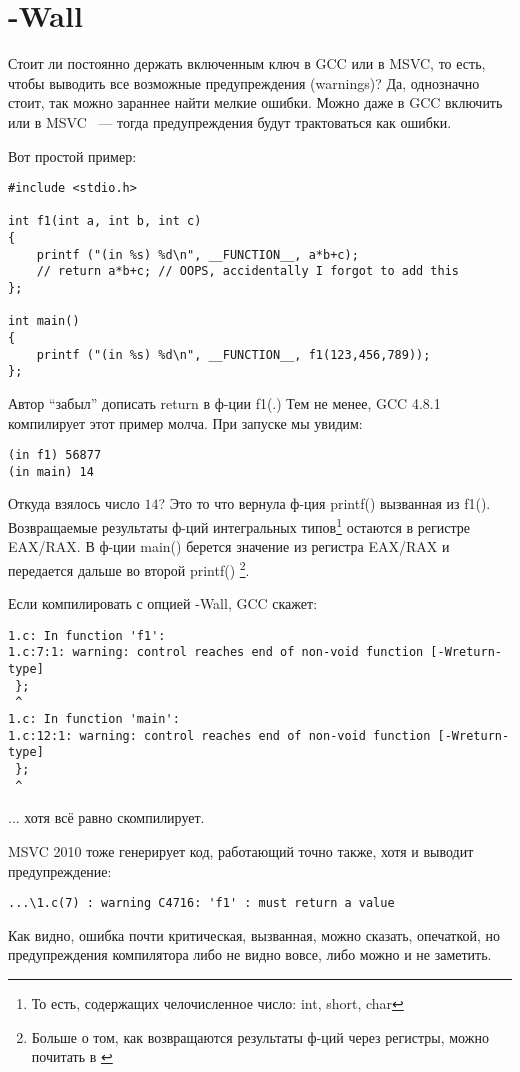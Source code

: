 ﻿\section{-Wall}

Стоит ли постоянно держать включенным ключ  в GCC или  в MSVC, то есть, чтобы выводить
все возможные предупреждения (warnings)?
Да, однозначно стоит, так можно зараннее найти мелкие ошибки.
Можно даже в GCC включить  или  в MSVC ~--- 
тогда предупреждения будут трактоваться как ошибки.

Вот простой пример:

\begin{lstlisting}
#include <stdio.h>

int f1(int a, int b, int c)
{
	printf ("(in %s) %d\n", __FUNCTION__, a*b+c);
	// return a*b+c; // OOPS, accidentally I forgot to add this
};

int main()
{
	printf ("(in %s) %d\n", __FUNCTION__, f1(123,456,789));
};
\end{lstlisting}

Автор ``забыл'' дописать return в ф-ции f1(.)
Тем не менее, GCC 4.8.1 компилирует этот пример молча.
При запуске мы увидим:

\begin{lstlisting}
(in f1) 56877
(in main) 14
\end{lstlisting}

Откуда взялось число $14$? Это то что вернула ф-ция printf() вызванная из f1(). Возвращаемые результаты
ф-ций интегральных типов\footnote{То есть, содержащих челочисленное число: int, short, char}
остаются в регистре EAX/RAX. В ф-ции main() берется значение из регистра EAX/RAX
и передается дальше во второй printf()
\footnote{Больше о том, как возвращаются результаты ф-ций через регистры, можно почитать в \cite{REBook}}.

Если компилировать с опцией -Wall, GCC скажет:

\begin{lstlisting}
1.c: In function 'f1':
1.c:7:1: warning: control reaches end of non-void function [-Wreturn-type]
 };
 ^
1.c: In function 'main':
1.c:12:1: warning: control reaches end of non-void function [-Wreturn-type]
 };
 ^
\end{lstlisting}

... хотя всё равно скомпилирует.

MSVC 2010 тоже генерирует код, работающий точно также, хотя и выводит предупреждение:

\begin{lstlisting}
...\1.c(7) : warning C4716: 'f1' : must return a value
\end{lstlisting}

Как видно, ошибка почти критическая, вызванная, можно сказать, опечаткой, но предупреждения компилятора
либо не видно вовсе, либо можно и не заметить.

